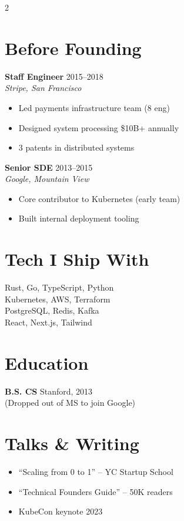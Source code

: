 \documentclass[11pt,a4paper]{article}
\begin{document}
\begin{multicols}{2}
\columnbreak

\section{Before Founding}

\noindent\textbf{Staff Engineer} \hfill \textcolor{accent}{2015--2018}\\
\textit{Stripe, San Francisco}
\begin{itemize}[leftmargin=0.8em,nosep,label={\color{accent}\textbf{/}}]
\item Led payments infrastructure team (8 eng)
\item Designed system processing \$10B+ annually
\item 3 patents in distributed systems
\end{itemize}
\vspace{0.4em}

\noindent\textbf{Senior SDE} \hfill \textcolor{accent}{2013--2015}\\
\textit{Google, Mountain View}
\begin{itemize}[leftmargin=0.8em,nosep,label={\color{accent}\textbf{/}}]
\item Core contributor to Kubernetes (early team)
\item Built internal deployment tooling
\end{itemize}

\section{Tech I Ship With}
\noindent Rust, Go, TypeScript, Python\\
Kubernetes, AWS, Terraform\\
PostgreSQL, Redis, Kafka\\
React, Next.js, Tailwind

\section{Education}
\noindent\textbf{B.S. CS} \hfill Stanford, 2013\\
{\small (Dropped out of MS to join Google)}

\section{Talks \& Writing}
\begin{itemize}[leftmargin=0.8em,nosep,label={\color{accent}\textbf{/}}]
\item ``Scaling from 0 to 1'' -- YC Startup School
\item ``Technical Founders Guide'' -- 50K readers
\item KubeCon keynote 2023
\end{itemize}

\end{multicols}
\end{document}
